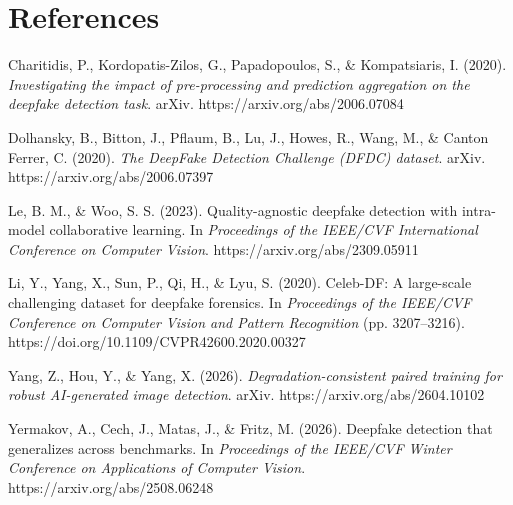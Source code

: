 \documentclass[10pt,twocolumn]{article}
\begin{document}
\clearpage
\section*{References}
\begingroup
\small
\setlength{\parindent}{-0.5cm}
\setlength{\leftskip}{0.5cm}

Charitidis, P., Kordopatis-Zilos, G., Papadopoulos, S., \& Kompatsiaris, I.
(2020). \emph{Investigating the impact of pre-processing and prediction
aggregation on the deepfake detection task}. arXiv.
https://arxiv.org/abs/2006.07084

\medskip
Dolhansky, B., Bitton, J., Pflaum, B., Lu, J., Howes, R., Wang, M., \&
Canton Ferrer, C. (2020). \emph{The DeepFake Detection Challenge (DFDC)
dataset}. arXiv. https://arxiv.org/abs/2006.07397

\medskip
Le, B. M., \& Woo, S. S. (2023). Quality-agnostic deepfake detection with
intra-model collaborative learning. In \emph{Proceedings of the IEEE/CVF
International Conference on Computer Vision}.
https://arxiv.org/abs/2309.05911

\medskip
Li, Y., Yang, X., Sun, P., Qi, H., \& Lyu, S. (2020). Celeb-DF: A large-scale
challenging dataset for deepfake forensics. In \emph{Proceedings of the
IEEE/CVF Conference on Computer Vision and Pattern Recognition} (pp.
3207--3216). https://doi.org/10.1109/CVPR42600.2020.00327

\medskip
Yang, Z., Hou, Y., \& Yang, X. (2026). \emph{Degradation-consistent paired
training for robust AI-generated image detection}. arXiv.
https://arxiv.org/abs/2604.10102

\medskip
Yermakov, A., Cech, J., Matas, J., \& Fritz, M. (2026). Deepfake detection
that generalizes across benchmarks. In \emph{Proceedings of the IEEE/CVF
Winter Conference on Applications of Computer Vision}.
https://arxiv.org/abs/2508.06248

\endgroup
\end{document}
